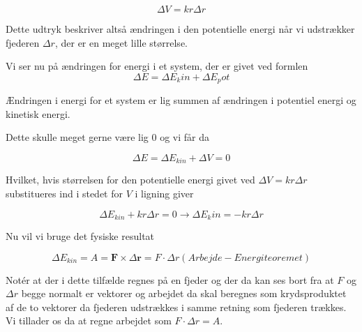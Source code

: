 \documentclass[12pt,a4paper]{article}
\theoremstyle{break}
\theoremstyle{nonumberplain}
\begin{document}
\bigskip

\begin{equation}
\Delta V = kr \Delta r
\end{equation} 

\bigskip

Dette udtryk beskriver altså ændringen i den potentielle energi når vi udstrækker fjederen $\Delta r$, der er en meget lille størrelse. 

\bigskip

Vi ser nu på ændringen for energi i et system, der er givet ved formlen 
\begin{equation}
\Delta E = \Delta E_kin + \Delta E_pot
\end{equation}

\bigskip

Ændringen i energi for et system er lig summen af ændringen i potentiel energi og kinetisk energi. 

Dette skulle meget gerne være lig 0 og vi får da 

\bigskip

\begin{equation}
\Delta E = \Delta E_{kin} + \Delta V = 0
\end{equation}

\bigskip

Hvilket, hvis størrelsen for den potentielle energi givet ved $\Delta V = kr \Delta r$ substitueres ind i stedet for $V$ i ligning  giver

\bigskip

\begin{equation}
\Delta E_{kin} + kr \Delta r = 0 \rightarrow \Delta E_kin = -kr \Delta r
\end{equation}

\bigskip

Nu vil vi bruge det fysiske resultat

\bigskip

\begin{equation}
\Delta E_{kin} = A = \textbf{F} \times \Delta \textbf{r} = F \cdot \Delta r (Arbejde-Energi teoremet)
\end{equation}

\bigskip

Notér at der i dette tilfælde regnes på en fjeder og der da kan ses bort fra at $F$ og $\Delta r$ begge normalt er vektorer og arbejdet da skal beregnes som krydsproduktet af de to vektorer da fjederen udstrækkes i samme retning som fjederen trækkes. Vi tillader os da at regne arbejdet som $F \cdot \Delta r = A$.
\end{document}
